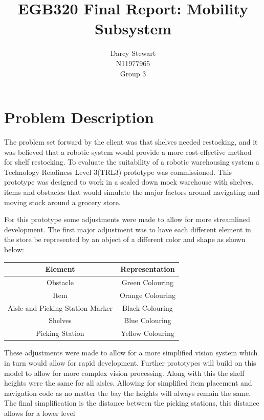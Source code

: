 \documentclass{article}
\title{EGB320 Final Report: Mobility Subsystem}
\author{Darcy Stewart
\\N11977965
\\ Group 3}
\begin{document}
\maketitle
\pagebreak
{}
\begin{center}
   \tableofcontents 
\end{center}
\pagebreak
\restoregeometry{}
\section{Problem Description}
The problem set forward by the client was that shelves needed restocking, and it was believed that a robotic system would provide a more cost-effective method for shelf
restocking. To evaluate the suitability of a robotic warehousing system a Technology Readiness Level 3(TRL3) prototype was commissioned. This prototype was designed to work in a scaled
down mock warehouse with shelves, items and obstacles that would simulate the major factors around navigating and moving stock around a grocery store.
\par
For this prototype some adjustments were made to allow for more streamlined development. The first major adjustment was to have each different element in the store be
represented by an object of a different color and shape as shown below:
\par
\begin{center}
\begin{tabular}{ |c|c| } 
 \hline
 Element & Representation \\ 
 \hline
 Obstacle & Green Colouring \\ 
 Item & Orange Colouring\\ 
 Aisle and Picking Station Marker & Black Colouring\\
 Shelves & Blue Colouring\\
 Picking Station & Yellow Colouring\\
 \hline
\end{tabular}
\end{center}
These adjustments were made to allow for a more simplified vision system which in turn would allow for rapid development. Further prototypes will build on this model to
allow for more complex vision processing. Along with this the shelf heights were the same for all aisles. Allowing for simplified item placement and navigation code as
no matter the bay the heights will always remain the same. The final simplification is the distance between the picking stations, this distance allows for a lower level
\end{document}
